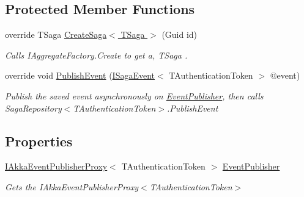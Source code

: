 \subsection*{Protected Member Functions}
\begin{DoxyCompactItemize}
\item 
override T\+Saga \hyperlink{classCqrs_1_1Akka_1_1Domain_1_1AkkaSagaRepository_a2c7263d0e58d2b31149ec685d5be934a_a2c7263d0e58d2b31149ec685d5be934a}{Create\+Saga$<$ T\+Saga $>$} (Guid id)
\begin{DoxyCompactList}\small\item\em Calls I\+Aggregate\+Factory.\+Create to get a, {\itshape T\+Saga} . \end{DoxyCompactList}\item 
override void \hyperlink{classCqrs_1_1Akka_1_1Domain_1_1AkkaSagaRepository_a7f6375bb99e680792466fb420232a535_a7f6375bb99e680792466fb420232a535}{Publish\+Event} (\hyperlink{interfaceCqrs_1_1Events_1_1ISagaEvent}{I\+Saga\+Event}$<$ T\+Authentication\+Token $>$ @event)
\begin{DoxyCompactList}\small\item\em Publish the saved {\itshape event}  asynchronously on \hyperlink{classCqrs_1_1Akka_1_1Domain_1_1AkkaSagaRepository_a25957859d1f98ea7f434983c562e9724_a25957859d1f98ea7f434983c562e9724}{Event\+Publisher}, then calls Saga\+Repository$<$\+T\+Authentication\+Token$>$.\+Publish\+Event \end{DoxyCompactList}\end{DoxyCompactItemize}
\subsection*{Properties}
\begin{DoxyCompactItemize}
\item 
\hyperlink{interfaceCqrs_1_1Akka_1_1Events_1_1IAkkaEventPublisherProxy}{I\+Akka\+Event\+Publisher\+Proxy}$<$ T\+Authentication\+Token $>$ \hyperlink{classCqrs_1_1Akka_1_1Domain_1_1AkkaSagaRepository_a25957859d1f98ea7f434983c562e9724_a25957859d1f98ea7f434983c562e9724}{Event\+Publisher}
\begin{DoxyCompactList}\small\item\em Gets the I\+Akka\+Event\+Publisher\+Proxy$<$\+T\+Authentication\+Token$>$ \end{DoxyCompactList}\end{DoxyCompactItemize}


